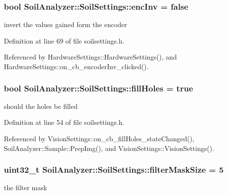 \hypertarget{class_soil_analyzer_1_1_soil_settings_ad831e13b61fc2097219bbf7252f045d5}{}
\subsubsection[{enc\+Inv}]{\setlength{\rightskip}{0pt plus 5cm}bool Soil\+Analyzer\+::\+Soil\+Settings\+::enc\+Inv = false}\label{class_soil_analyzer_1_1_soil_settings_ad831e13b61fc2097219bbf7252f045d5}
invert the values gained form the encoder 

Definition at line 69 of file soilsettings.\+h.



Referenced by Hardware\+Settings\+::\+Hardware\+Settings(), and Hardware\+Settings\+::on\+\_\+cb\+\_\+encoder\+Inv\+\_\+clicked().

\hypertarget{class_soil_analyzer_1_1_soil_settings_a2c9dbe9429742aed1da9d9683da5cc1e}{}
\subsubsection[{fill\+Holes}]{\setlength{\rightskip}{0pt plus 5cm}bool Soil\+Analyzer\+::\+Soil\+Settings\+::fill\+Holes = true}\label{class_soil_analyzer_1_1_soil_settings_a2c9dbe9429742aed1da9d9683da5cc1e}
should the holes be filled 

Definition at line 54 of file soilsettings.\+h.



Referenced by Vision\+Settings\+::on\+\_\+cb\+\_\+fill\+Holes\+\_\+state\+Changed(), Soil\+Analyzer\+::\+Sample\+::\+Prep\+Img(), and Vision\+Settings\+::\+Vision\+Settings().

\hypertarget{class_soil_analyzer_1_1_soil_settings_ad9d5071bbf6d10638df024e883c6199f}{}
\subsubsection[{filter\+Mask\+Size}]{\setlength{\rightskip}{0pt plus 5cm}uint32\+\_\+t Soil\+Analyzer\+::\+Soil\+Settings\+::filter\+Mask\+Size = 5}\label{class_soil_analyzer_1_1_soil_settings_ad9d5071bbf6d10638df024e883c6199f}
the filter mask 

